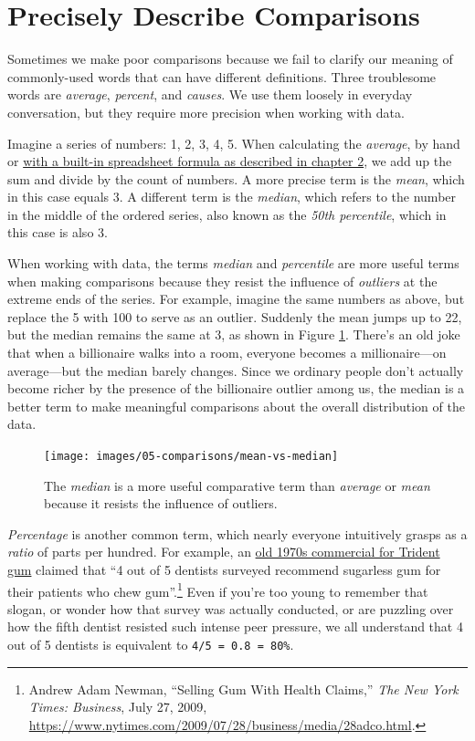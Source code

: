 \documentclass[
  english,
]{book}
\begin{document}
\hypertarget{describe-comparisons}{%
\section*{Precisely Describe Comparisons}\label{describe-comparisons}}

Sometimes we make poor comparisons because we fail to clarify our meaning of commonly-used words that can have different definitions. Three troublesome words are \emph{average}, \emph{percent}, and \emph{causes}. We use them loosely in everyday conversation, but they require more precision when working with data.

Imagine a series of numbers: 1, 2, 3, 4, 5. When calculating the \emph{average}, by hand or \href{calculate.html}{with a built-in spreadsheet formula as described in chapter 2}, we add up the sum and divide by the count of numbers. A more precise term is the \emph{mean}, which in this case equals 3. A different term is the \emph{median}, which refers to the number in the middle of the ordered series, also known as the \emph{50th percentile}, which in this case is also 3.

When working with data, the terms \emph{median} and \emph{percentile} are more useful terms when making comparisons because they resist the influence of \emph{outliers} at the extreme ends of the series. For example, imagine the same numbers as above, but replace the 5 with 100 to serve as an outlier. Suddenly the mean jumps up to 22, but the median remains the same at 3, as shown in Figure \ref{fig:mean-vs-median}. There's an old joke that when a billionaire walks into a room, everyone becomes a millionaire---on average---but the median barely changes. Since we ordinary people don't actually become richer by the presence of the billionaire outlier among us, the median is a better term to make meaningful comparisons about the overall distribution of the data.



\begin{figure}
\texttt{[image: images/05-comparisons/mean-vs-median]} \caption{The \emph{median} is a more useful comparative term than \emph{average} or \emph{mean} because it resists the influence of outliers.}\label{fig:mean-vs-median}
\end{figure}

\emph{Percentage} is another common term, which nearly everyone intuitively grasps as a \emph{ratio} of parts per hundred. For example, an \href{https://en.wikipedia.org/wiki/Trident_gum}{old 1970s commercial for Trident gum} claimed that ``4 out of 5 dentists surveyed recommend sugarless gum for their patients who chew gum''.\footnote{Andrew Adam Newman, {``Selling {Gum With Health Claims},''} \emph{The New York Times: Business}, July 27, 2009, \url{https://www.nytimes.com/2009/07/28/business/media/28adco.html}.} Even if you're too young to remember that slogan, or wonder how that survey was actually conducted, or are puzzling over how the fifth dentist resisted such intense peer pressure, we all understand that 4 out of 5 dentists is equivalent to \texttt{4/5\ =\ 0.8\ =\ 80\%}.
\end{document}
